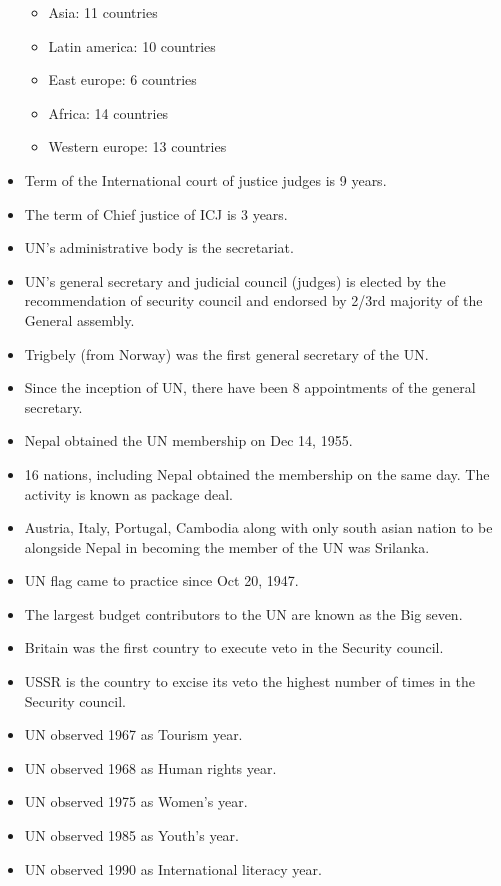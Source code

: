 \documentclass[
]{book}
\providecommand{\tightlist}{%
  \setlength{\itemsep}{0pt}\setlength{\parskip}{0pt}}
\begin{document}
\begin{itemize}
  \begin{itemize}
  \tightlist
  \item
    Asia: 11 countries
  \item
    Latin america: 10 countries
  \item
    East europe: 6 countries
  \item
    Africa: 14 countries
  \item
    Western europe: 13 countries
  \end{itemize}
\item
  Term of the International court of justice judges is 9 years.
\item
  The term of Chief justice of ICJ is 3 years.
\item
  UN's administrative body is the secretariat.
\item
  UN's general secretary and judicial council (judges) is elected by the recommendation of security council and endorsed by 2/3rd majority of the General assembly.
\item
  Trigbely (from Norway) was the first general secretary of the UN.
\item
  Since the inception of UN, there have been 8 appointments of the general secretary.
\item
  Nepal obtained the UN membership on Dec 14, 1955.
\item
  16 nations, including Nepal obtained the membership on the same day. The activity is known as package deal.
\item
  Austria, Italy, Portugal, Cambodia along with only south asian nation to be alongside Nepal in becoming the member of the UN was Srilanka.
\item
  UN flag came to practice since Oct 20, 1947.
\item
  The largest budget contributors to the UN are known as the Big seven.
\item
  Britain was the first country to execute veto in the Security council.
\item
  USSR is the country to excise its veto the highest number of times in the Security council.
\item
  UN observed 1967 as Tourism year.
\item
  UN observed 1968 as Human rights year.
\item
  UN observed 1975 as Women's year.
\item
  UN observed 1985 as Youth's year.
\item
  UN observed 1990 as International literacy year.

\end{itemize}
\end{document}
